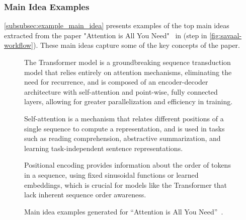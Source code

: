 \subsubsection{Main Idea Examples}
\label{subsubsec:example_main_idea}

\autoref{subsubsec:example_main_idea} presents examples of the top main ideas extracted from the paper "Attention is All You Need"~\cite{attention_is_all_you_need} in \name (step  in \autoref{fig:savaal-workflow}). These main ideas capture some of the key concepts of the paper.

\begin{figure}[t]
\centering
\begin{tcolorbox}[width=1\linewidth, colframe=white, colback=gray!10, sharp corners=southwest, title=]

\begin{tcolorbox}[colframe=black!50, colback=gray!10, title=Transformer model]
The Transformer model is a groundbreaking sequence transduction model that relies entirely on attention mechanisms, eliminating the need for recurrence, and is composed of an encoder-decoder architecture with self-attention and point-wise, fully connected layers, allowing for greater parallelization and efficiency in training.
\end{tcolorbox}


\begin{tcolorbox}[colframe=black!50, colback=gray!10, title=Self-attention mechanism]
Self-attention is a mechanism that relates different positions of a single sequence to compute a representation, and is used in tasks such as reading comprehension, abstractive summarization, and learning task-independent sentence representations.
\end{tcolorbox}

\begin{tcolorbox}
[colframe=black!50, colback=gray!10, title=Positional encoding]
Positional encoding provides information about the order of tokens in a sequence, using fixed sinusoidal functions or learned embeddings, which is crucial for models like the Transformer that lack inherent sequence order awareness.
\end{tcolorbox}

\end{tcolorbox}
\centering
\caption{Main idea examples generated for ``Attention is All You Need''~\cite{attention_is_all_you_need}.}
\label{fig:main_idea_example}
\end{figure}

